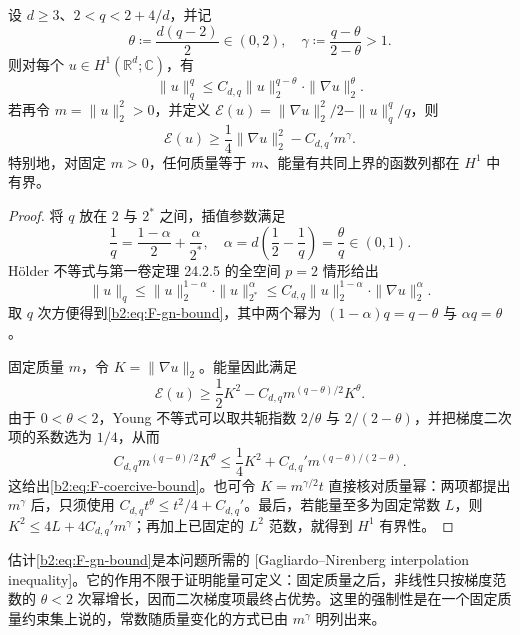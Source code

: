 \begin{proposition}
\label{b2:prop:F-gn-coercivity}
设 \(d\ge3\)、\(2<q<2+4/d\)，并记
\[
 \theta\coloneqq\frac{d(q-2)}2\in(0,2),
 \quad \gamma\coloneqq\frac{q-\theta}{2-\theta}>1.
\]
则对每个 \(u\in H^1(\mathbb R^d;\mathbb C)\)，有
\begin{equation}
\label{b2:eq:F-gn-bound}
 \|u\|_q^q\le C_{d,q}\|u\|_2^{q-\theta}
                         \cdot\|\nabla u\|_2^\theta.
\end{equation}
若再令 \(m=\|u\|_2^2>0\)，并定义
\(\mathcal E(u)=\|\nabla u\|_2^2/2-\|u\|_q^q/q\)，则
\begin{equation}
\label{b2:eq:F-coercive-bound}
 \mathcal E(u)\ge\frac14\|\nabla u\|_2^2-C_{d,q}'m^\gamma.
\end{equation}
特别地，对固定 \(m>0\)，任何质量等于 \(m\)、能量有共同上界的函数列都在 \(H^1\) 中有界。
\end{proposition}
\begin{proof}
将 \(q\) 放在 \(2\) 与 \(2^*\) 之间，插值参数满足
\[
 \frac1q=\frac{1-\alpha}{2}+\frac\alpha{2^*},
 \quad
 \alpha=d\left(\frac12-\frac1q\right)=\frac\theta q\in(0,1).
\]
Hölder 不等式与第一卷定理 24.2.5 的全空间 \(p=2\) 情形给出
\[
 \|u\|_q\le\|u\|_2^{1-\alpha}\cdot\|u\|_{2^*}^{\alpha}
 \le C_{d,q}\|u\|_2^{1-\alpha}\cdot\|\nabla u\|_2^{\alpha}.
\]
取 \(q\) 次方便得到\eqref{b2:eq:F-gn-bound}，其中两个幂为 \((1-\alpha)q=q-\theta\) 与 \(\alpha q=\theta\)。

固定质量 \(m\)，令 \(K=\|\nabla u\|_2\)。能量因此满足
\[
 \mathcal E(u)\ge\frac12K^2-C_{d,q}m^{(q-\theta)/2}K^\theta.
\]
由于 \(0<\theta<2\)，Young 不等式可以取共轭指数 \(2/\theta\) 与 \(2/(2-\theta)\)，并把梯度二次项的系数选为 \(1/4\)，从而
\[
 C_{d,q}m^{(q-\theta)/2}K^\theta
 \le\frac14K^2+C_{d,q}'m^{(q-\theta)/(2-\theta)}.
\]
这给出\eqref{b2:eq:F-coercive-bound}。也可令 \(K=m^{\gamma/2}t\) 直接核对质量幂：两项都提出 \(m^\gamma\) 后，只须使用 \(C_{d,q}t^\theta\le t^2/4+C_{d,q}'\)。最后，若能量至多为固定常数 \(L\)，则
\(K^2\le4L+4C_{d,q}'m^\gamma\)；再加上已固定的 \(L^2\) 范数，就得到 \(H^1\) 有界性。
\end{proof}

估计\eqref{b2:eq:F-gn-bound}是本问题所需的 [Gagliardo–Nirenberg interpolation inequality]。它的作用不限于证明能量可定义：固定质量之后，非线性只按梯度范数的 \(\theta<2\) 次幂增长，因而二次梯度项最终占优势。这里的强制性是在一个固定质量约束集上说的，常数随质量变化的方式已由 \(m^\gamma\) 明列出来。

